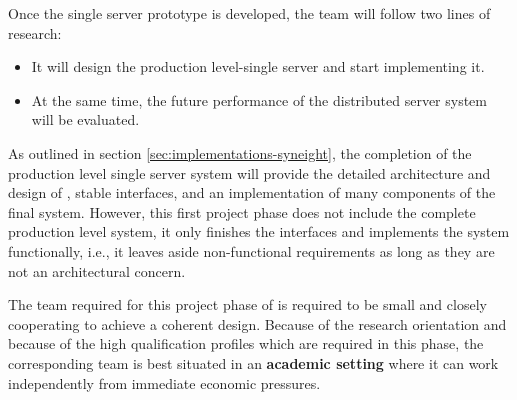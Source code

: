 \documentclass[a4paper, 10pt]{book}
\begin{document}
                                        Once the single server prototype is developed, the team will follow
                                        two lines of research: 
                                        \begin{itemize}
                                            \item It will design the production level-single server and start
                                                implementing it. 
                                            \item At the same time, the future performance of the distributed
                                                server system will be evaluated. 
                                        \end{itemize}

                                        As outlined in section \vref{sec:implementations-syneight}, the completion
                                        of the production level single server system will provide the detailed
                                        architecture and design of \SYNEIGHT, stable interfaces, and an
                                        implementation of many components of the final system. However, this
                                        first project phase does not include the complete production level
                                        system, it only finishes the interfaces and implements the system
                                        functionally, i.e., it leaves aside non-functional requirements as
                                        long as they are not an architectural concern.

                                        The team required for this project phase of \SYNEIGHT is required to be
                                        small and closely cooperating to achieve a coherent design.  Because
                                        of the research orientation and because of the high qualification
                                        profiles which are required in this phase, the corresponding team is
                                        best situated in an \textbf{academic setting} where it can work
                                        independently from immediate economic pressures.
\end{document}
